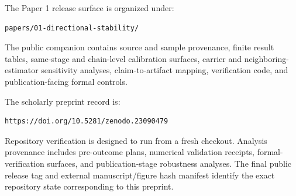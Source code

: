 \documentclass[11pt]{article}
\begin{document}
The Paper 1 release surface is organized under:
\begin{verbatim}
papers/01-directional-stability/
\end{verbatim}

The public companion contains source and sample provenance, finite result tables, same-stage and chain-level calibration surfaces, carrier and neighboring-estimator sensitivity analyses, claim-to-artifact mapping, verification code, and publication-facing formal controls.

The scholarly preprint record is:
\begin{verbatim}
https://doi.org/10.5281/zenodo.23090479
\end{verbatim}

Repository verification is designed to run from a fresh checkout. Analysis provenance includes pre-outcome plans, numerical validation receipts, formal-verification surfaces, and publication-stage robustness analyses. The final public release tag and external manuscript/figure hash manifest identify the exact repository state corresponding to this preprint.
\end{document}
